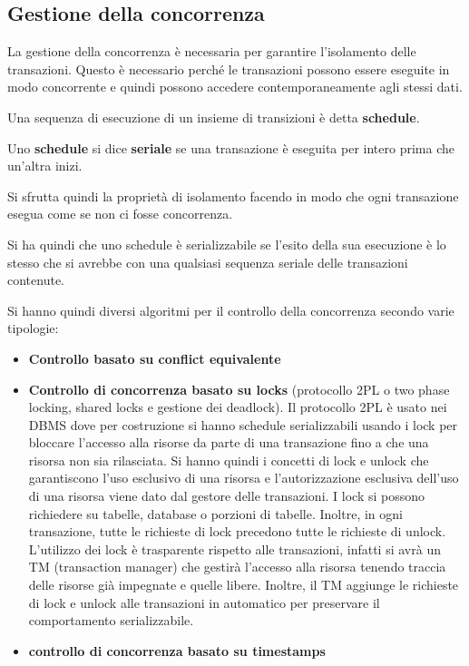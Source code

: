 \subsection{Gestione della concorrenza}
La gestione della concorrenza è necessaria per garantire l'isolamento delle
transazioni. Questo è necessario perché le transazioni possono essere eseguite
in modo concorrente e quindi possono accedere contemporaneamente agli stessi
dati.
\begin{definizione}
    Una sequenza di esecuzione di un insieme di transizioni è detta \textbf{schedule}.

   
\end{definizione}
\begin{definizione}
    Uno \textbf{schedule} si dice \textbf{seriale} se una transazione è eseguita per intero prima
    che un'altra inizi.
\end{definizione}

Si sfrutta quindi la proprietà di isolamento facendo in modo che ogni
transazione esegua come se non ci fosse concorrenza.

Si ha quindi che uno schedule è serializzabile se l'esito della sua esecuzione è
lo stesso che si avrebbe con una qualsiasi sequenza seriale delle transazioni
contenute.

Si hanno quindi diversi algoritmi per il controllo della concorrenza secondo
varie tipologie:
\begin{itemize}
    \item \textbf{Controllo basato su conflict equivalente}
    \item \textbf{Controllo di concorrenza basato su locks} (protocollo 2PL o two
          phase locking, shared locks e gestione dei deadlock). Il protocollo
          2PL è usato nei DBMS dove per costruzione si hanno schedule
          serializzabili usando i lock per bloccare l'accesso alla risorse da
          parte di una transazione fino a che una risorsa non sia rilasciata.
          Si hanno quindi i concetti di lock e unlock che garantiscono l'uso
          esclusivo di una risorsa e l'autorizzazione esclusiva dell'uso di una
          risorsa viene dato dal gestore delle transazioni. I lock si possono 
          richiedere su tabelle, database o porzioni di tabelle.
          Inoltre, in ogni transazione, tutte le richieste di lock precedono tutte
          le richieste di unlock. L'utilizzo dei lock è trasparente rispetto alle 
          transazioni, infatti si avrà un TM (transaction manager) che gestirà
          l'accesso alla risorsa tenendo traccia delle risorse già impegnate e quelle 
          libere. Inoltre, il TM aggiunge le richieste di lock e unlock alle 
          transazioni in automatico per preservare il comportamento serializzabile. 
    \item \textbf{controllo di concorrenza basato su timestamps}
\end{itemize}
